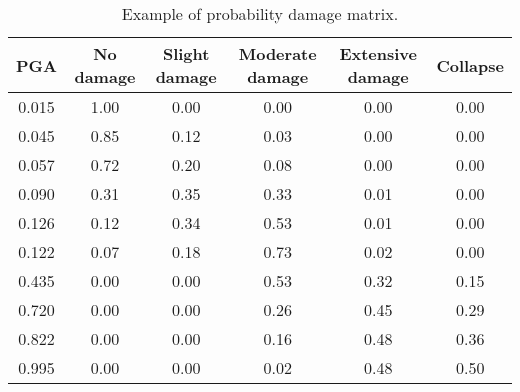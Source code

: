 \begin {table}[htb]
\caption{Example of probability damage matrix.} 
\label{table:PDM} 
\begin{center}
  \begin{tabular}{ | c | c | c | c | c | c |}
  \hline
    PGA & No damage & Slight damage & Moderate damage & Extensive damage & Collapse \\ \hline
    0.015 & 1.00 & 0.00 & 0.00 & 0.00 & 0.00 \\ \hline
    0.045 & 0.85 & 0.12 & 0.03 & 0.00 & 0.00 \\ \hline
    0.057 & 0.72 & 0.20 & 0.08 & 0.00 & 0.00 \\ \hline
    0.090 & 0.31 & 0.35 & 0.33 & 0.01 & 0.00 \\ \hline
    0.126 & 0.12 & 0.34 & 0.53 & 0.01 & 0.00 \\ \hline
    0.122 & 0.07 & 0.18 & 0.73 & 0.02 & 0.00 \\ \hline
    0.435 & 0.00 & 0.00 & 0.53 & 0.32 & 0.15 \\ \hline
    0.720 & 0.00 & 0.00 & 0.26 & 0.45 & 0.29 \\ \hline
    0.822 & 0.00 & 0.00 & 0.16 & 0.48 & 0.36 \\ \hline
    0.995 & 0.00 & 0.00 & 0.02 & 0.48 & 0.50  \\ \hline
  \end{tabular}
\end{center}
\end{table}
